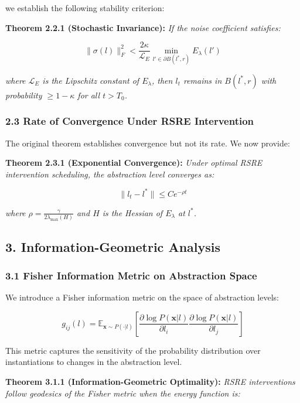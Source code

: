 \documentclass[
]{article}
\begin{document}
we establish the following stability criterion:

\textbf{Theorem 2.2.1 (Stochastic Invariance):} \emph{If the noise
coefficient satisfies:}

\[\|\sigma(l)\|_F^2 < \frac{2 \kappa}{\mathcal{L}_E} \min_{l' \in \partial B(l^*, r)} E_{\lambda}(l')\]

\emph{where \(\mathcal{L}_E\) is the Lipschitz constant of
\(E_{\lambda}\), then \(l_t\) remains in \(B(l^*, r)\) with probability
\(\geq 1-\kappa\) for all \(t > T_0\).}

\subsubsection{2.3 Rate of Convergence Under RSRE
Intervention}\label{rate-of-convergence-under-rsre-intervention}

The original theorem establishes convergence but not its rate. We now
provide:

\textbf{Theorem 2.3.1 (Exponential Convergence):} \emph{Under optimal
RSRE intervention scheduling, the abstraction level converges as:}

\[\|l_t - l^*\| \leq C e^{-\rho t}\]

\emph{where \(\rho = \frac{\gamma}{2\lambda_{\max}(H)}\) and \(H\) is
the Hessian of \(E_{\lambda}\) at \(l^*\).}

\subsection{3. Information-Geometric
Analysis}\label{information-geometric-analysis}

\subsubsection{3.1 Fisher Information Metric on Abstraction
Space}\label{fisher-information-metric-on-abstraction-space}

We introduce a Fisher information metric on the space of abstraction
levels:

\[g_{ij}(l) = \mathbb{E}_{\mathbf{x} \sim P(\cdot|l)}\left[ \frac{\partial \log P(\mathbf{x}|l)}{\partial l_i} \frac{\partial \log P(\mathbf{x}|l)}{\partial l_j} \right]\]

This metric captures the sensitivity of the probability distribution
over instantiations to changes in the abstraction level.

\textbf{Theorem 3.1.1 (Information-Geometric Optimality):} \emph{RSRE
interventions follow geodesics of the Fisher metric when the energy
function is:}
\end{document}
